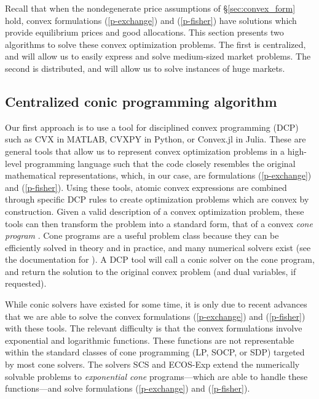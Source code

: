 \documentclass[12pt]{article}
\begin{document}
Recall that when the nondegenerate price assumptions of \S\ref{sec:convex_form}
hold, convex formulations (\ref{p-exchange}) and (\ref{p-fisher}) have
solutions which provide equilibrium prices and good allocations. 
This section presents two algorithms to solve these convex optimization problems.
The first is
centralized, and will allow us to easily express and solve medium-sized market
problems. The second is distributed, and will allow us to solve
instances of huge markets.


\subsection{Centralized conic programming algorithm}
\label{sec:centralized}

Our first approach is to use a tool for disciplined convex programming (DCP)
\cite{GBY:06,Grant2004} such as CVX \cite{cvx} in MATLAB, CVXPY \cite{cvxpy} in
Python, or Convex.jl \cite{convex.jl} in Julia. These are general tools that
allow us to represent convex optimization problems in a high-level programming
language such that the code closely resembles the original mathematical
representations, which, in our case, are formulations (\ref{p-exchange}) and
(\ref{p-fisher}). Using these tools, atomic convex expressions are combined
through specific DCP rules to create optimization problems which are convex by
construction. Given a valid description of a convex optimization problem, these
tools can then transform the problem into a standard form, that of a convex
\emph{cone program} \cite{nn.ip}. Cone programs are a useful problem class
because they can be efficiently solved in theory and in practice,
and many numerical solvers exist (see the
documentation for \cite{cvx,cvxpy,convex.jl}). A DCP tool
will call a conic solver on the cone program, and return the solution
to the original convex problem (and dual variables, if requested).

While conic solvers have existed for some time, it is only due to recent
advances \cite{scs,ecos-exp} that we are able to solve the convex formulations
(\ref{p-exchange}) and (\ref{p-fisher}) with these tools. The relevant
difficulty is that the convex formulations involve exponential and logarithmic
functions. These functions are not representable within the standard classes of
cone programming (LP, SOCP, or SDP) targeted by most cone solvers. The solvers
SCS \cite{scs} and ECOS-Exp \cite{ecos-exp} extend the numerically solvable
problems to \emph{exponential cone} programs---which are able to handle these
functions---and solve formulations (\ref{p-exchange}) and (\ref{p-fisher}).
\end{document}

